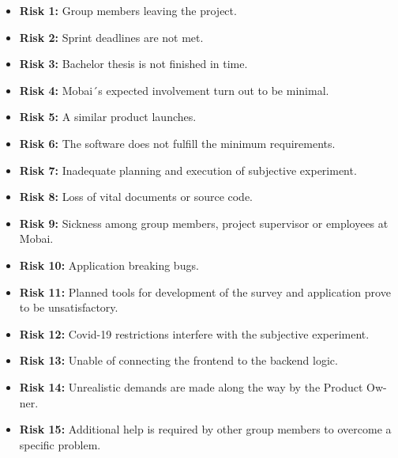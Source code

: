 \begin{itemize}
    \item \textbf{Risk 1:} Group members leaving the project.
    \item \textbf{Risk 2:} Sprint deadlines are not met.
    \item \textbf{Risk 3:} Bachelor thesis is not finished in time.
    \item \textbf{Risk 4:} Mobai´s expected involvement turn out to be minimal. 
    \item \textbf{Risk 5:} A similar product launches.
    \item \textbf{Risk 6:} The software does not fulfill the minimum requirements.
    \item \textbf{Risk 7:} Inadequate planning and execution of subjective experiment.
    \item \textbf{Risk 8:} Loss of vital documents or source code.
    \item \textbf{Risk 9:} Sickness among group members, project supervisor or employees at Mobai.
    \item \textbf{Risk 10:} Application breaking bugs.
    \item \textbf{Risk 11:} Planned tools for development of the survey and application prove to be unsatisfactory. 
    \item \textbf{Risk 12:} Covid-19 restrictions interfere with the subjective experiment. 
    \item \textbf{Risk 13:} Unable of connecting the frontend to the backend logic. 
    \item \textbf{Risk 14:} Unrealistic demands are made along the way by the Product Ow-ner. 
    \item \textbf{Risk 15:} Additional help is required by other group members to overcome a specific problem.
\end{itemize}

